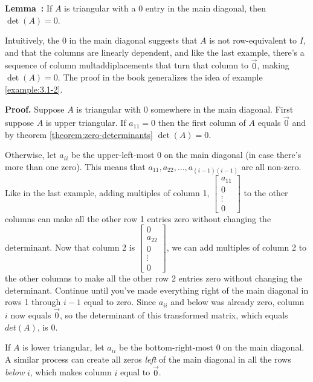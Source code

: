 \documentclass[11pt, letterpaper]{report}
\newenvironment{notes}{}{}
\newenvironment{book}{}{}
\newcounter{example}[section]
\newcounter{theorem}[chapter]
\newenvironment{lemma}[1][]{\refstepcounter{theorem}\begin{bbox}\par
    \noindent\textbf{Lemma~\thetheorem: #1}}{\end{bbox}}
\newlength\oldfboxsep%
\newlength\myminiwidth%
\newenvironment{bbox}{%
  \setlength\oldfboxsep\fboxsep
  \setlength{\fboxsep}{.1in}%
  \setlength\myminiwidth\linewidth%
  \addtolength\myminiwidth{-0.2in}%
  \vspace{0.1in}%
  \begin{lrbox}{\bboxbox}\begin{minipage}{\myminiwidth}%
    }{%
    \end{minipage}\end{lrbox}%
  \noindent\fbox{\usebox{\bboxbox}}\vspace{0.1in}\setlength\fboxsep\oldfboxsep%
}
\begin{document}
\begin{lemma} \label{theorem:detA-triangular-zero}  
 If $A$ is triangular with a $0$ entry in the main diagonal, then $\det(A) = 0$.
\end{lemma}

Intuitively, the $0$ in the main diagonal suggests that $A$ is not row-equivalent to $I$, and that the columns are linearly dependent, and like the last example, there's a sequence of column multaddiplacements that turn that column to $\vec{0}$, making $\det(A) = 0$.  
\begin{notes}
The proof in the book generalizes the idea of example \ref{example:3.1-2}.

\newpage
\end{notes}

\begin{book}
\textbf{Proof.} Suppose $A$ is triangular with $0$ somewhere in the main diagonal. First suppose $A$ is upper triangular. If $a_{11} = 0$ then the first column of $A$ equals $\vec{0}$ and by theorem \ref{theorem:zero-determinants} $\det(A) = 0$.

Otherwise, let $a_{ii}$ be the upper-left-most 0 on the main diagonal (in case there's more than one zero). This means that $a_{11}, a_{22}, \ldots, a_{(i-1)(i-1)}$ are all non-zero. Like in the last example, adding multiples of column 1, $\begin{bmatrix}
a_{11} \\ 0 \\ \vdots \\ 0
\end{bmatrix}$ to the other columns can make all the other row 1 entries zero without changing the determinant. Now that column 2 is $\begin{bmatrix}
0 \\ a_{22}\\0 \\\vdots \\0
\end{bmatrix}$, we can add multiples of column 2 to the other columns to make all the other row 2 entries zero without changing the determinant. Continue until you've made everything right of the main diagonal in rows 1 through $i-1$ equal to zero. Since $a_{ii}$ and below was already zero, column $i$ now equals $\vec{0}$, so the determinant of this transformed matrix, which equals $det(A)$, is 0.

If $A$ is lower triangular, let $a_{ii}$ be the bottom-right-most 0 on the main diagonal. A similar process can create all zeros \emph{left} of the main diagonal in all the rows \emph{below} $i$, which makes column $i$ equal to $\vec{0}$. \blacksquare
\end{book}
\end{document}
